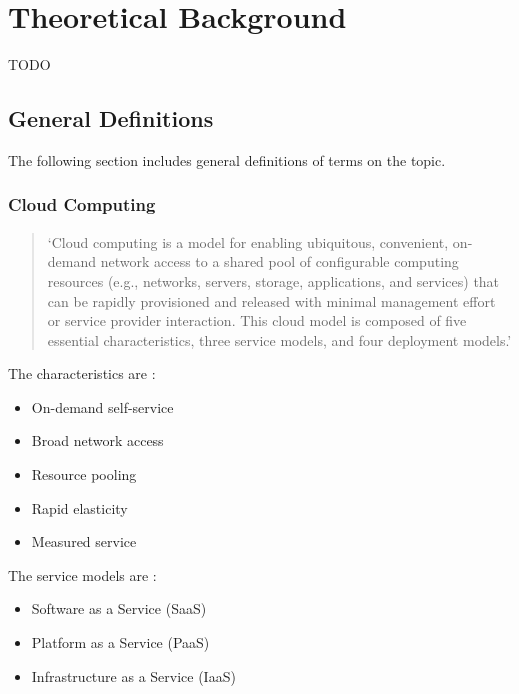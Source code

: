 \chapter{Theoretical Background} 	%


TODO


\section{General Definitions}
\label{theoretical-background:general-definitions}

The following section includes general definitions of terms on the topic.

\subsection*{Cloud Computing}

\begin{quotation}
\noindent
\enquote*{Cloud computing is a model for enabling ubiquitous, convenient, on-demand network access to a shared
	pool of configurable computing resources (e.g., networks, servers, storage, applications, and services) that
	can be rapidly provisioned and released with minimal management effort or service provider interaction.
	This cloud model is composed of five essential characteristics, three service models, and four deployment
	models.}
\autocite{cloudComputingNistDefinition2011}
\end{quotation}

The characteristics are
\autocite{cloudComputingNistDefinition2011}:

\begin{itemize}
	\item On-demand self-service
	\item Broad network access
	\item Resource pooling
	\item Rapid elasticity
	\item Measured service
\end{itemize}

The service models are
\autocite{cloudComputingNistDefinition2011}:

\begin{itemize}
	\item Software as a Service (SaaS)
	\item Platform as a Service (PaaS)
	\item Infrastructure as a Service (IaaS)
\end{itemize}


